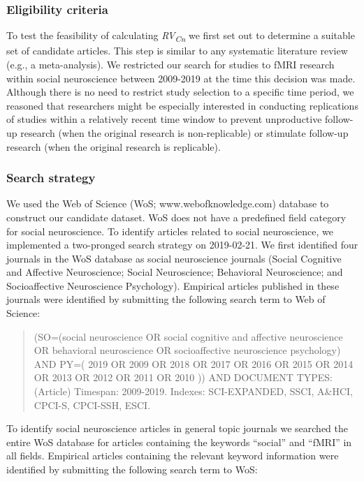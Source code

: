 \documentclass[
  man,floatsintext]{apa6}
\begin{document}
\hypertarget{eligibility-criteria}{%
\subsubsection{Eligibility criteria}\label{eligibility-criteria}}

To test the feasibility of calculating \emph{RV\textsubscript{Cn}} we first set out to determine a suitable set of candidate articles. This step is similar to any systematic literature review (e.g., a meta-analysis). We restricted our search for studies to fMRI research within social neuroscience between 2009-2019 at the time this decision was made. Although there is no need to restrict study selection to a specific time period, we reasoned that researchers might be especially interested in conducting replications of studies within a relatively recent time window to prevent unproductive follow-up research (when the original research is non-replicable) or stimulate follow-up research (when the original research is replicable).

\hypertarget{search-strategy}{%
\subsubsection{Search strategy}\label{search-strategy}}

We used the Web of Science (WoS; www.webofknowledge.com) database to construct our candidate dataset. WoS does not have a predefined field category for social neuroscience. To identify articles related to social neuroscience, we implemented a two-pronged search strategy on 2019-02-21. We first identified four journals in the WoS database as social neuroscience journals (Social Cognitive and Affective Neuroscience; Social Neuroscience; Behavioral Neuroscience; and Socioaffective Neuroscience Psychology). Empirical articles published in these journals were identified by submitting the following search term to Web of Science:

\begin{quote}
(SO=(social neuroscience OR social cognitive and affective neuroscience OR behavioral neuroscience OR socioaffective neuroscience psychology) AND PY=( 2019 OR 2009 OR 2018 OR 2017 OR 2016 OR 2015 OR 2014 OR 2013 OR 2012 OR 2011 OR 2010 )) AND DOCUMENT TYPES: (Article)
Timespan: 2009-2019. Indexes: SCI-EXPANDED, SSCI, A\&HCI, CPCI-S, CPCI-SSH, ESCI.
\end{quote}

To identify social neuroscience articles in general topic journals we searched the entire WoS database for articles containing the keywords ``social'' and ``fMRI'' in all fields. Empirical articles containing the relevant keyword information were identified by submitting the following search term to WoS:
\end{document}
